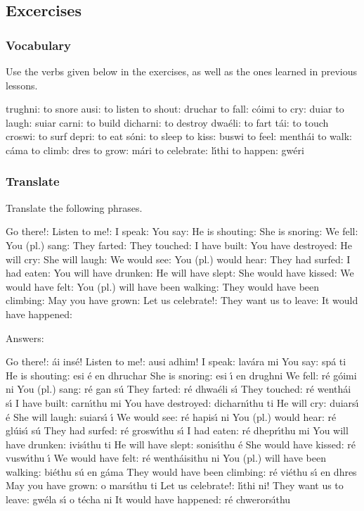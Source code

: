\subsection{Excercises}

\subsubsection{Vocabulary}
Use the verbs given below in the exercises, as well as the ones learned in previous lessons.

trughni: to snore
ausi: to listen
to shout: druchar
to fall: c\'{o}imi
to cry: duiar
to laugh: suiar
carni: to build
dicharni: to destroy
dwa\'{e}li: to fart
t\'{a}i: to touch
croswi: to surf
depri: to eat
s\'{o}ni: to sleep
to kiss: buswi
to feel: menth\'{a}i
to walk: c\'{a}ma 
to climb: dres 
to grow: m\'{a}ri 
to celebrate: l\'{\i}thi
to happen: gw\'{e}ri

\subsubsection{Translate}

Translate the following phrases. 

Go there!: 
Listen to me!: 
I speak:
You say:
He is shouting:
She is snoring:
We fell:
You (pl.) sang:
They farted:
They touched:
I have built:
You have destroyed:
He will cry:
She will laugh:
We would see:
You (pl.) would hear:
They had surfed:
I had eaten:
You will have drunken:
He will have slept:
She would have kissed:
We would have felt: 
You (pl.) will have been walking:
They would have been climbing:
May you have grown: 
Let us celebrate!:
They want us to leave:
It would have happened:


Answers:

Go there!: \'{a}i ins\'{e}!
Listen to me!: ausi adhim!
I speak: lav\'{a}ra mi
You say: sp\'{a} ti
He is shouting: esi \'{e} en dhruchar
She is snoring: esi \'{\i} en drughni
We fell: r\'{e} g\'{o}imi ni
You (pl.) sang: r\'{e} gan s\'{u}
They farted: r\'{e} dhwa\'{e}li s\'{\i}
They touched: r\'{e} wenth\'{a}i s\'{\i}
I have built: carn\'{\i}thu mi
You have destroyed: dicharn\'{\i}thu ti
He will cry: duiars\'{\i} \'{e}
She will laugh: suiars\'{\i} \'{\i}
We would see: r\'{e} hapis\'{\i} ni
You (pl.) would hear: r\'{e} gl\'{u}is\'{\i} s\'{u}
They had surfed: r\'{e} grosw\'{\i}thu s\'{\i}
I had eaten: r\'{e} dhepr\'{\i}thu mi
You will have drunken: ivis\'{\i}thu ti
He will have slept: sonis\'{\i}thu \'{e}
She would have kissed: r\'{e} vusw\'{\i}thu \'{\i}
We would have felt: r\'{e} wenth\'{a}isithu ni
You (pl.) will have been walking: bi\'{e}thu s\'{u} en g\'{a}ma
They would have been climbing: r\'{e} vi\'{e}thu s\'{\i} en dhres
May you have grown: o mars\'{\i}thu ti
Let us celebrate!: l\'{\i}thi ni!
They want us to leave: gw\'{e}la s\'{\i} o t\'{e}cha ni
It would have happened: r\'{e} chwerors\'{\i}thu
